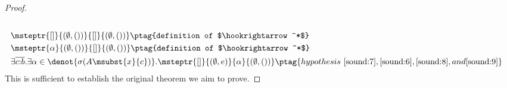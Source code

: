 \begin{proof}
{\begin{alignat}{2}
  \\&\msteptr{[]}{(\emptyset, ())}{[]}{(\emptyset, ())} \ptag{definition of $\hookrightarrow^*$} \label{sound:8}
  \\&\msteptr{\alpha}{(\emptyset, ())}{[]}{(\emptyset, ())} \ptag{definition of $\hookrightarrow^*$} \label{sound:9}
  \\&\exists \overline{c{:}b}.\exists \alpha \in\denot{\sigma(A\msubst{x}{c})}. \msteptr{[]}{(\emptyset, e)}{\alpha}{(\emptyset, ())}
\ptag{hypothesis~\ref{sound:7}, \ref{sound:6},\ref{sound:8}, and \ref{sound:9}}
  \label{sound:10}
\end{alignat}}\noindent
This is sufficient to establish the original theorem we aim to prove.
\end{proof}






